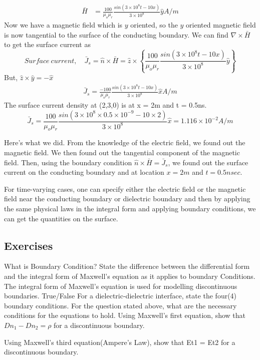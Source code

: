 \begin{exmp}
\begin{align*}
\bar{H} &= \frac{100}{\mu_o\mu_r}\frac{sin(3\times 10^8t -10x)}{3\times 10^8}\hat{y} A/m
\end{align*}
Now we have a magnetic field which is $y$ oriented, so the $y$ oriented magnetic field is now tangential to the surface of the conducting boundary. We can find $\nabla\times\bar{H}$ to get the surface current as
\begin{dmath*}
Surface\ current,\quad \bar{J}_s = \hat{n}\times\bar{H} = \hat{z}\times \left\lbrace \frac{100}{\mu_o\mu_r}\frac{sin(3\times 10^8t -10x)}{3\times 10^8}\hat{y} \right\rbrace  
\end{dmath*}
But, $\hat{z}\times\hat{y} = -\hat{x}$
\begin{align*}
\bar{J}_s = \frac{-100}{\mu_o\mu_r}\frac{sin(3\times 10^8t -10x)}{3\times 10^8}\hat{x} A/m
\end{align*}
The surface current density at (2,3,0) is at x = 2m and t = 0.5ns.
\begin{dmath*}
\bar{J}_s = \frac{100}{\mu_o\mu_r}\frac{sin(3\times 10^8\times 0.5 \times 10^{-9} - 10\times 2)}{3\times 10^8}\hat{x} = 1.116\times 10^{-2} A/m
\end{dmath*}
\end{exmp} 
Here's what we did. From the knowledge of the electric field, we found out the magnetic field. We then found out the tangential component of the magnetic field. Then, using the boundary condition $\hat{n}\times\bar{H} = \bar{J}_s$, we found out the surface current on the conducting boundary and at location $x = 2m$ and $t = 0.5nsec$.

For time-varying cases, one can specify either the electric field or the magnetic field near the conducting boundary or dielectric boundary and then by applying the same physical laws in the integral form and applying boundary conditions, we can get the quantities on the surface.

\begin{mdframed}[backgroundcolor=lightblue, linewidth=1pt, hidealllines=true]
\section*{Exercises}
\begin{ExerciseList}
\Exercise[label={ex201}] What is Boundary Condition?
\Exercise[label={ex202}] State the difference between the differential form and the integral form of Maxwell's equation as it applies to boundary Conditions.
\Exercise[label={ex203}] The integral form of Maxwell's equation is used for modelling discontinuous boundaries. True/False
\Exercise[label={ex204}] For a dielectric-dielectric interface, state the four(4) boundary conditions.
\Exercise[label={ex205}] For the question stated above, what are the necessary conditions for the equations to hold.
\Exercise[label={ex206}]
Using Maxwell's first equation, show that $Dn_1 - Dn_2 = \rho$ for a discontinuous boundary.

\Exercise[label={ex207}] Using Maxwell's third equation(Ampere's Law), show that Et1 = Et2 for a discontinuous boundary.
\end{ExerciseList}
\end{mdframed}
